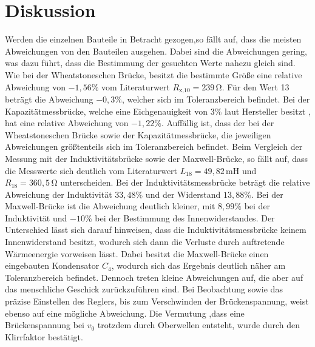 \section{Diskussion}

\begin{flushleft}
    Werden die einzelnen Bauteile in Betracht gezogen,so fällt auf, dass die meisten Abweichungen von den Bauteilen ausgehen.
    Dabei sind die Abweichungen gering, was dazu führt, dass die Bestimmung der gesuchten Werte nahezu gleich sind.
    Wie bei der Wheatstoneschen Brücke, besitzt die bestimmte Größe eine relative Abweichung von $-1,56\%$ vom Literaturwert $R_{\text{x,10}} = 239\,\unit{\ohm}$.
    Für den Wert 13 beträgt die Abweichung $-0,3\%$, welcher sich im Toleranzbereich befindet. 
    Bei der Kapazitätmessbrücke, welche eine Eichgenauigkeit von $3\%$ laut Hersteller besitzt \cite{a1}, hat eine relative Abweichung von $-1,22\%$.
    Auffällig ist, dass der bei der Wheatstoneschen Brücke sowie der Kapazitätmessbrücke, die jeweiligen Abweichungen größtenteils sich im Toleranzbereich befindet.
    Beim  Vergleich der Messung mit der Induktivitätsbrücke sowie der Maxwell-Brücke, so fällt auf, dass die Messwerte sich deutlich vom Literaturwert $L_{18} = 49,82\,\unit{\milli\henry}$ und $R_{18} = 360,5\,\unit{\ohm}$ unterscheiden.
    Bei der Induktivitätsmessbrücke beträgt die relative Abweichung der Induktivität $33,48\%$ und der Widerstand $13,88\%$.
    Bei der Maxwell-Brücke ist die Abweichung deutlich kleiner, mit $8,99\%$ bei der Induktivität und $-10\%$ bei der Bestimmung des Innenwiderstandes. 
    Der Unterschied lässt sich darauf hinweisen, dass die Induktivitätsmessbrücke keinem Innenwiderstand besitzt, wodurch sich dann die Verluste durch auftretende Wärmeenergie vorweisen lässt.
    Dabei besitzt die Maxwell-Brücke einen eingebauten Kondensator $C_{4}$, wodurch sich das Ergebnis deutlich näher am Toleranzbereich befindet. 
    Dennoch treten kleine Abweichungen auf, die aber auf das menschliche Geschick zurückzuführen sind. 
    Bei Beobachtung sowie das präzise Einstellen des Reglers, bis zum Verschwinden der Brückenspannung, weist ebenso auf eine mögliche Abweichung.
    Die Vermutung ,dass eine Brückenspannung bei $v_{0}$ trotzdem durch Oberwellen entsteht, wurde durch den Klirrfaktor bestätigt.
\end{flushleft}
